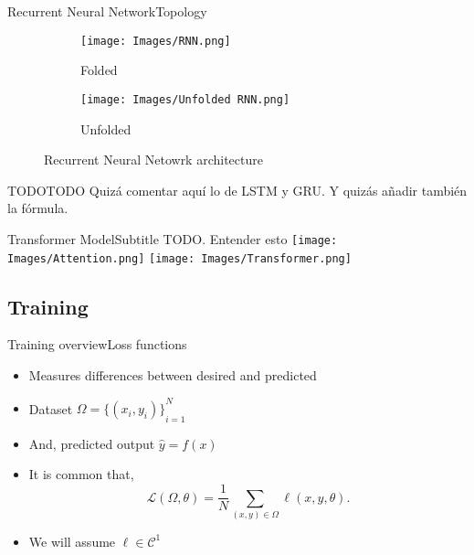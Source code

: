 \documentclass{beamer}
\newcommand{\loss}{\mathcal{L}}
\begin{document}
\begin{frame}{Recurrent Neural Network}{Topology}
  \begin{figure}
    \begin{subfigure}[t]{.2\textwidth}
      \centering
      \caption{Folded}
      \texttt{[image: Images/RNN.png]}
    \end{subfigure}\hfill
    \begin{subfigure}[t]{.8\textwidth}
      \centering
      \caption{Unfolded}
      \texttt{[image: Images/Unfolded RNN.png]}
    \end{subfigure}
    \caption{Recurrent Neural Netowrk architecture}
  \end{figure}
\end{frame}

\begin{frame}{TODO}{TODO}
  Quizá comentar aquí lo de LSTM y GRU.
  Y quizás añadir también la fórmula.
\end{frame}

\begin{frame}{Transformer Model}{Subtitle}
  TODO. Entender esto
  \texttt{[image: Images/Attention.png]}
  \texttt{[image: Images/Transformer.png]}
\end{frame}


\subsection{Training}

\begin{frame}{Training overview}{Loss functions}
  \begin{itemize}
    \item Measures differences between desired and predicted
    \item Dataset \(\Omega = {\{(x_i, y_i)\}}_{i=1}^N\)
    \item And, predicted output \(\hat{y} = f(x)\)
    \item It is common that,
    \begin{equation}
      \loss(\Omega, \theta) =
      \frac{1}{N} \sum_{(x, y) \in \Omega} \ell (x, y, \theta).
    \end{equation}
    \item We will assume \(\ell \in \mathcal{C}^1\)
  \end{itemize}
\end{frame}
\end{document}
